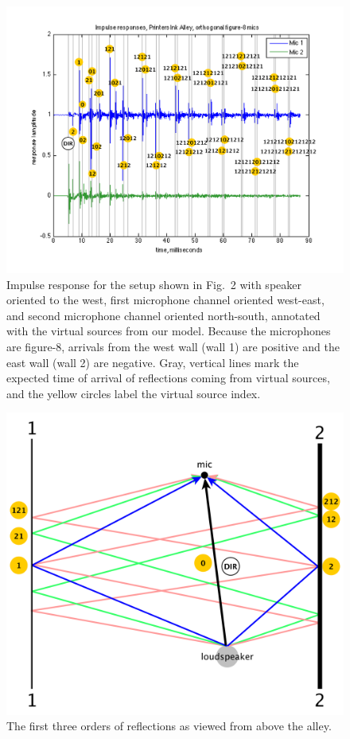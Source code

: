 \documentclass{aes137}
\begin{document}
\begin{figure}[h!] \centering \includegraphics[width=\linewidth]{images/annotated_reflections_v2.pdf} 
\caption{Impulse response for the setup shown in Fig.~2 with speaker
  oriented to the west, first microphone channel oriented west-east, and second microphone channel oriented north-south, annotated with the virtual sources from our
  model. Because the microphones are figure-8, arrivals from the west wall (wall 1) are positive
and the east wall (wall 2) are negative. Gray, vertical lines mark the expected time of arrival of
  reflections coming from virtual sources, and the yellow circles
  label the virtual source index.} %
\end{figure}

\begin{figure}[h!] \centering \includegraphics[width=0.7\linewidth]{images/planview_paths_v2.pdf} 
\caption{The first three orders of reflections as viewed from above the alley.} 
\end{figure}
\end{document}
